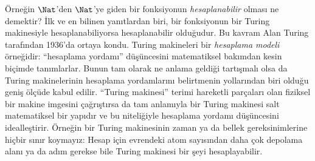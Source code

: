 


Örneğin $\Nat$'den $\Nat$'ye giden bir fonksiyonun
\emph{hesaplanabilir} olması ne demektir? İlk ve en bilinen yanıtlardan biri,
bir fonksiyonun bir Turing makinesiyle hesaplanabiliyorsa hesaplanabilir
olduğudur. Bu kavram Alan Turing tarafından 1936'da ortaya kondu. Turing
makineleri bir \emph{hesaplama modeli} örneğidir: ``hesaplama yordamı''
düşüncesini matematiksel bakımdan kesin biçimde tanımlarlar. Bunun tam olarak
ne anlama geldiği tartışmalı olsa da Turing makinelerinin hesaplama
yordamlarını belirtmenin yollarından biri olduğu geniş ölçüde kabul edilir.
``Turing makinesi'' terimi hareketli parçaları olan fiziksel bir makine
imgesini çağrıştırsa da tam anlamıyla bir Turing makinesi salt matematiksel
bir yapıdır ve bu niteliğiyle hesaplama yordamı düşüncesini idealleştirir.
Örneğin bir Turing makinesinin zaman ya da bellek gereksinimlerine hiçbir
sınır koymayız: Hesap için evrendeki atom sayısından daha çok depolama alanı
ya da adım gerekse bile Turing makinesi bir şeyi hesaplayabilir.

